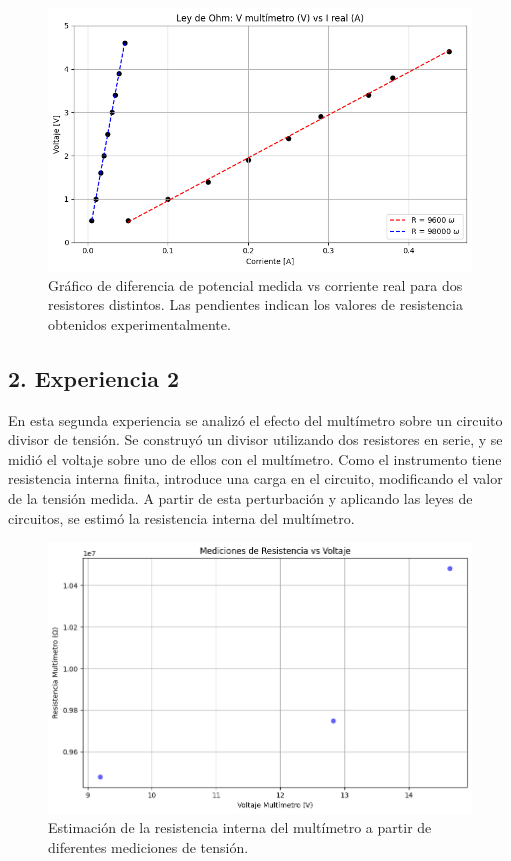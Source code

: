 \documentclass[11pt]{article}
\begin{document}
\begin{figure}[H]
    \centering
    \includegraphics[width=0.8\linewidth]{Ohm.png}
    \caption{Gráfico de diferencia de potencial medida vs corriente real para dos resistores distintos. Las pendientes indican los valores de resistencia obtenidos experimentalmente.}
    \label{fig:ohm}
\end{figure}

\subsection*{2. Experiencia 2}

En esta segunda experiencia se analizó el efecto del multímetro sobre un circuito divisor de tensión. Se construyó un divisor utilizando dos resistores en serie, y se midió el voltaje sobre uno de ellos con el multímetro. Como el instrumento tiene resistencia interna finita, introduce una carga en el circuito, modificando el valor de la tensión medida. A partir de esta perturbación y aplicando las leyes de circuitos, se estimó la resistencia interna del multímetro.

\begin{figure}[H]
    \centering
    \includegraphics[width=0.9\linewidth]{Rv.png}
    \caption{Estimación de la resistencia interna del multímetro a partir de diferentes mediciones de tensión.}
    \label{fig:rv}
\end{figure}
\end{document}
